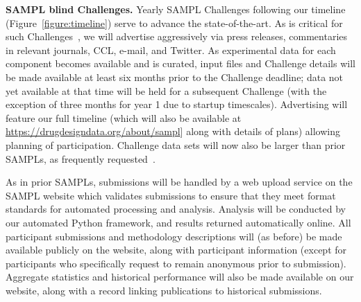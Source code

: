 \documentclass[11pt]{article}
\begin{document}
{\bf SAMPL blind Challenges.} Yearly SAMPL Challenges following our timeline (Figure~\ref{figure:timeline}) serve to advance the state-of-the-art.
As is critical for such Challenges~\cite{Saez-Rodriguez:2016:NatRevGenet}, we will advertise aggressively via press releases, commentaries in relevant journals, CCL, e-mail, and Twitter. 
As experimental data for each component becomes available and is curated, input files and Challenge details will be made available at least six months prior to the Challenge deadline; data not yet available at that time will be held for a subsequent Challenge (with the exception of three months for year 1 due to startup timescales).
Advertising will feature our full timeline (which will also be available at \url{https://drugdesigndata.org/about/sampl}] along with details of plans) allowing planning of participation. 
Challenge data sets will now also be larger than prior SAMPLs, as frequently requested~\cite{Mobley:2017:eScholarship}. 


As in prior SAMPLs, submissions will be handled by a web upload service on the SAMPL website which validates submissions to ensure that they meet format standards for automated processing and analysis. 
Analysis will be conducted by our automated Python framework, and results returned automatically online.
All participant submissions and methodology descriptions will (as before) be made available publicly on the website, along with participant information (except for participants who specifically request to remain anonymous prior to submission).
Aggregate statistics and historical performance will also be made available on our website, along with a record linking publications to historical submissions.
\end{document}
